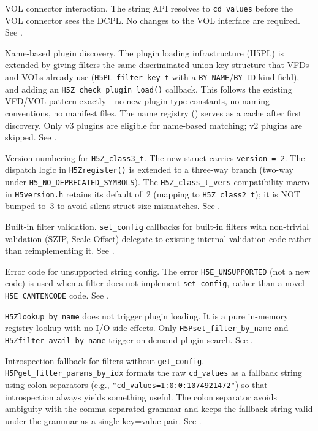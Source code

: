 \documentclass[../HDF5_RFC.tex]{subfiles}
\begin{document}
VOL connector interaction. The string API resolves to \texttt{cd\_values}
before the VOL connector sees the DCPL. No changes to the VOL interface are
required. See .

Name-based plugin discovery. The plugin loading infrastructure (H5PL)
is extended by giving filters the same discriminated-union key structure that
VFDs and VOLs already use (\texttt{H5PL\_filter\_key\_t} with a
\texttt{BY\_NAME}/\texttt{BY\_ID} kind field), and adding an
\texttt{H5Z\_check\_plugin\_load()} callback. This follows the existing VFD/VOL
pattern exactly---no new plugin type constants, no naming conventions, no
manifest files. The name registry () serves as a
cache after first discovery. Only v3 plugins are eligible for name-based
matching; v2 plugins are skipped. See .

Version numbering for \texttt{H5Z\_class3\_t}. The new struct carries
\texttt{version = 2}. The dispatch logic in \texttt{H5Zregister()} is extended to a
three-way branch (two-way under \texttt{H5\_NO\_DEPRECATED\_SYMBOLS}). The
\texttt{H5Z\_class\_t\_vers} compatibility macro in \texttt{H5version.h} retains its default
of~2 (mapping to \texttt{H5Z\_class2\_t}); it is NOT bumped to~3 to avoid silent
struct-size mismatches. See .

Built-in filter validation. \texttt{set\_config} callbacks for built-in
filters with non-trivial validation (SZIP, Scale-Offset) delegate to existing
internal validation code rather than reimplementing it. See
.

Error code for unsupported string config. The error
\texttt{H5E\_UNSUPPORTED} (not a new code) is used when a filter does not implement
\texttt{set\_config}, rather than a novel \texttt{H5E\_CANTENCODE} code. See
.

\texttt{H5Zlookup\_by\_name} does not trigger plugin loading. It is a pure
in-memory registry lookup with no I/O side effects. Only
\texttt{H5Pset\_filter\_by\_name} and \texttt{H5Zfilter\_avail\_by\_name} trigger on-demand
plugin search. See .

Introspection fallback for filters without \texttt{get\_config}.
\texttt{H5Pget\_filter\_params\_by\_idx} formats the raw \texttt{cd\_values} as a fallback
string using colon separators (e.g., \texttt{"cd\_values=1:0:0:1074921472"}) so that
introspection always yields something useful. The colon separator avoids
ambiguity with the comma-separated grammar and keeps the fallback string valid
under the grammar as a single key=value pair. See .
\end{document}
